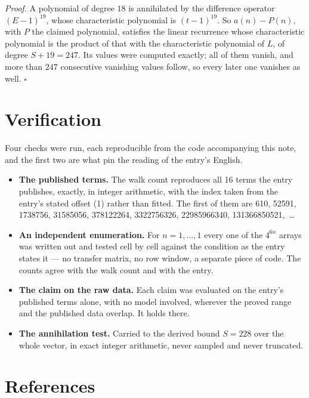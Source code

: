 \documentclass[11pt]{article}
\theoremstyle{definition}
\begin{document}
{\itshape Proof.} A polynomial of degree $18$ is annihilated by the difference operator $(E-1)^{19}$, whose characteristic polynomial is $(t-1)^{19}$. So $a(n) - P(n)$, with $P$ the claimed polynomial, satisfies the linear recurrence whose characteristic polynomial is the product of that with the characteristic polynomial of $L$, of degree $S + 19 = 247$. Its values were computed exactly; all of them vanish, and more than $247$ consecutive vanishing values follow, so every later one vanishes as well. $\square$

\section{Verification}

Four checks were run, each reproducible from the code accompanying this note, and the first two are what pin the reading of the entry's English.

\begin{itemize}

\item {\bfseries The published terms.} The walk count reproduces all 16 terms the entry publishes, exactly, in integer arithmetic, with the index taken from the entry's stated offset (1) rather than fitted. The first of them are 610, 52591, 1738756, 31585056, 378122264, 3322756326, 22985966340, 131366850521,~\dots

\item {\bfseries An independent enumeration.} For $n = 1,\dots,1$ every one of the $4^{6n}$ arrays was written out and tested cell by cell against the condition as the entry states it --- no transfer matrix, no row window, a separate piece of code. The counts agree with the walk count and with the entry.

\item {\bfseries The claim on the raw data.} Each claim was evaluated on the entry's published terms alone, with no model involved, wherever the proved range and the published data overlap. It holds there.

\item {\bfseries The annihilation test.} Carried to the derived bound $S = 228$ over the whole vector, in exact integer arithmetic, never sampled and never truncated.

\end{itemize}

\section{References}
\end{document}
